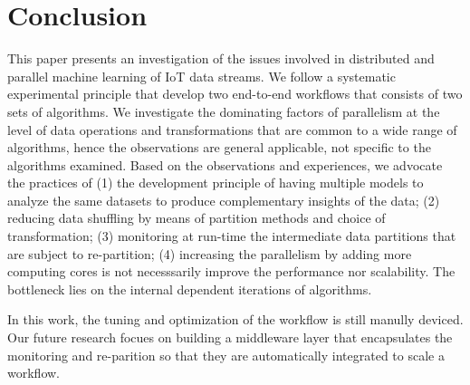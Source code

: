 \chapter{Conclusion}

This paper presents an investigation of the issues involved in distributed and parallel machine learning of IoT data streams. We follow a systematic experimental principle that develop two end-to-end workflows that consists of two sets of algorithms. We investigate the dominating factors of parallelism at the level of data operations and transformations that are common to a wide range of algorithms, hence the observations are general applicable, not specific to the algorithms examined. Based on the observations and experiences, we advocate the practices of (1) the development principle of having multiple models to analyze the same datasets to produce complementary insights of the data; (2) reducing data shuffling by means of partition methods and choice of transformation; (3) monitoring at run-time the intermediate data partitions that are subject to re-partition; (4) increasing the parallelism by adding more computing cores is not necesssarily improve the performance nor scalability. The bottleneck lies on the internal dependent iterations of algorithms. 

In this work, the tuning and optimization of the workflow is still manully deviced. Our future research focues on building a middleware layer that encapsulates the monitoring and re-parition so that they are automatically integrated to scale a workflow. 
